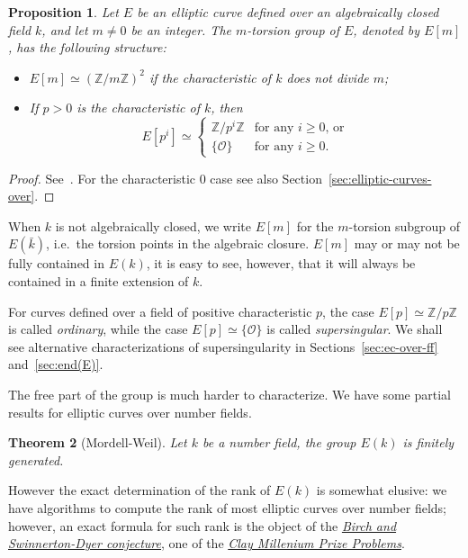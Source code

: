 \documentclass[10pt]{article}
\theoremstyle{plain}
\newtheorem{theorem}{Theorem}
\newtheorem{proposition}[theorem]{Proposition}
\theoremstyle{definition}
\def\O{\ensuremath{\mathcal{O}}}
\begin{document}
\begin{proposition}
  Let $E$ be an elliptic curve defined over an algebraically closed
  field $k$, and let $m≠0$ be an integer. %
  The $m$-torsion group of $E$, denoted by $E[m]$, has the following
  structure:
  \begin{itemize}
  \item $E[m] ≃ (ℤ/mℤ)^2$ if the characteristic of $k$ does not divide
    $m$;
  \item If $p>0$ is the characteristic of $k$, then 
    \[E[p^i] ≃
      \begin{cases}
        ℤ/p^iℤ & \text{for any $i≥0$, or}\\
        \{\O\} & \text{for any $i≥0$.}
      \end{cases}
    \]
  \end{itemize}
\end{proposition}
\begin{proof}
  See~\cite[Coro.~6.4]{silverman:elliptic}. For the characteristic $0$
  case see also Section~\ref{sec:elliptic-curves-over}.
\end{proof}

When $k$ is not algebraically closed, we write $E[m]$ for the
$m$-torsion subgroup of $E(\bar{k})$, i.e.\ the torsion points in the
algebraic closure. %
$E[m]$ may or may not be fully contained in $E(k)$, it is easy to see,
however, that it will always be contained in a finite extension of
$k$.

For curves defined over a field of positive characteristic $p$, the
case $E[p]≃ℤ/pℤ$ is called \emph{ordinary}, while the case
$E[p]≃\{\O\}$ is called \emph{supersingular}. %
We shall see alternative characterizations of supersingularity in
Sections~\ref{sec:ec-over-ff} and~\ref{sec:end(E)}.

The free part of the group is much harder to characterize. %
We have some partial results for elliptic curves over number fields.

\begin{theorem}[Mordell-Weil]
  Let $k$ be a number field, the group $E(k)$ is finitely generated.
\end{theorem}

However the exact determination of the rank of $E(k)$ is somewhat
elusive: we have algorithms to compute the rank of most elliptic
curves over number fields; however, an exact formula for such rank is
the object of the
\href{https://en.wikipedia.org/wiki/Birch_and_Swinnerton-Dyer_conjecture}{\it
  Birch and Swinnerton-Dyer conjecture}, one of the
\href{https://en.wikipedia.org/wiki/Millennium_Prize_Problems}{\it
  Clay Millenium Prize Problems}.
\end{document}
